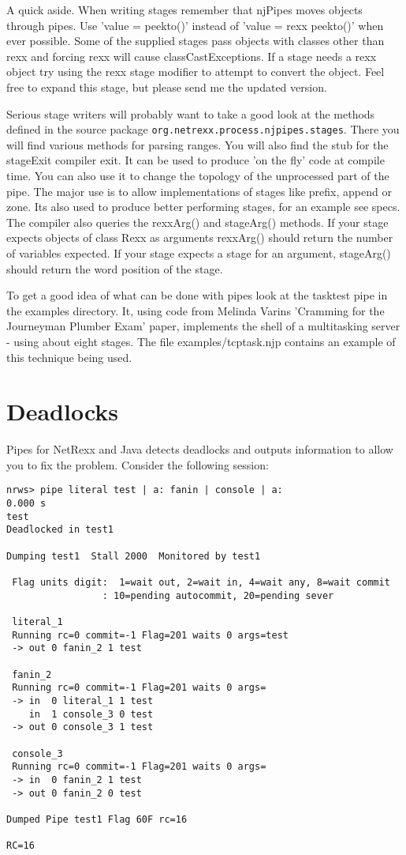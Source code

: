 A quick aside.  When writing stages remember that njPipes moves objects through pipes.  Use 'value = peekto()' instead of 'value = rexx peekto()' when ever possible.  Some of the supplied stages pass objects with classes other than rexx and forcing rexx will cause classCastExceptions. If a stage needs a rexx object try using the rexx stage modifier to attempt to convert the object.  Feel free to expand this stage, but please send me the updated version.

Serious stage writers will probably want to take a good look at the
methods defined in the \nr{} source package \texttt{org.netrexx.process.njpipes.stages}.  There you will find various methods for parsing ranges.  You will also find the stub for the stageExit compiler exit.  It can be used to produce 'on the fly' code at compile time.  You can also use it to change the topology of the unprocessed part of the pipe.  The major use is to allow implementations of stages like prefix, append or zone.  Its also used to produce better performing stages, for an example see specs.
The compiler also queries the rexxArg() and stageArg() methods.  If your stage expects objects of class Rexx as arguments rexxArg() should return the number of variables expected.  If your stage expects a stage for an argument, stageArg() should return the word position of the stage.

To get a good idea of what can be done with pipes look at the tasktest pipe in the examples directory.  It, using code from Melinda Varins 'Cramming for the Journeyman Plumber Exam' paper,  implements the shell of a  multitasking server - using about eight stages.  The file examples/tcptask.njp contains an example of this technique being used.

\chapter{Deadlocks}
Pipes for NetRexx and Java detects deadlocks and outputs information to allow you to fix the problem.  Consider the following session:
\begin{verbatim}
nrws> pipe literal test | a: fanin | console | a:                                                                       0.000 s
test
Deadlocked in test1

Dumping test1  Stall 2000  Monitored by test1

 Flag units digit:  1=wait out, 2=wait in, 4=wait any, 8=wait commit
                 : 10=pending autocommit, 20=pending sever

 literal_1
 Running rc=0 commit=-1 Flag=201 waits 0 args=test
 -> out 0 fanin_2 1 test

 fanin_2
 Running rc=0 commit=-1 Flag=201 waits 0 args=
 -> in  0 literal_1 1 test
    in  1 console_3 0 test
 -> out 0 console_3 1 test

 console_3
 Running rc=0 commit=-1 Flag=201 waits 0 args=
 -> in  0 fanin_2 1 test
 -> out 0 fanin_2 0 test

Dumped Pipe test1 Flag 60F rc=16

RC=16
\end{verbatim}

